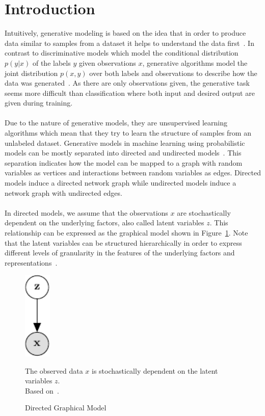 \section{Introduction}
\label{sec:introduction}

Intuitively, generative modeling is based on the idea that in order to produce data similar to samples from a dataset it helps to understand the data first~\cite[p.~720]{deeplearning:2016}.
In contrast to discriminative models which model the conditional distribution $p(y|x)$ of the labels $y$ given observations $x$, generative algorithms model the joint distribution $p(x,y)$ over both labels and observations to describe how the data was generated~\cite{learning_dbn:2006}.
As there are only observations given, the generative task seems more difficult than classification where both input and desired output are given during training.~\cite[p.~695]{deeplearning:2016}\\\\
%
Due to the nature of generative models, they are unsupervised learning algorithms which mean that they try to learn the structure of samples from an unlabeled dataset\cite[p.~105-106]{deeplearning:2016}\cite{prob_unsupervised:1999}.
%
Generative models in machine learning using probabilistic models can be mostly separated into directed and undirected models~\cite[p.~77]{deeplearning:2016}.
%
This separation indicates how the model can be mapped to a graph with random variables as vertices and interactions between random variables as edges.
Directed models induce a directed network graph while undirected models induce a network graph with undirected edges.\\\\
%
%
In directed models, we assume that the observations $x$ are stochastically dependent on the underlying factors, also called latent variables $z$. This relationship can be expressed as the graphical model shown in Figure~\ref{fig:dgm}.
Note that the latent variables can be structured hierarchically in order to express different levels of granularity in the features of the underlying factors and representations~\cite[p.~557]{deeplearning:2016}.
\begin{figure}[htb]
\centering
  \includegraphics[width=1.3cm]{media/directed_graphical_model}
  \caption[Graphical Model]{Directed Graphical Model}
\label{fig:dgm}
  \medskip
  \small
  The observed data $x$ is stochastically dependent on the latent variables $z$.\\
  Based on~\cite[Chapter 8]{bishop:2006}.
\end{figure}
